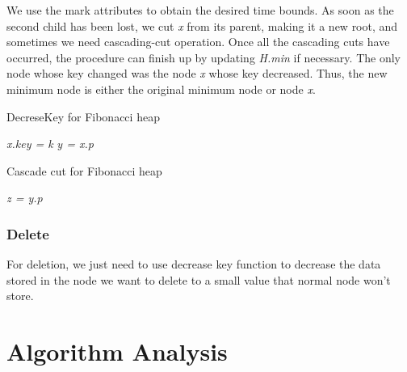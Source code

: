 \documentclass[12pt]{article}
\begin{document}
    We use the mark attributes to obtain the desired time bounds.
    As soon as the second child has been lost, we cut \emph{x} from its parent, making it a new
    root, and sometimes we need cascading-cut operation. Once all the cascading 
    cuts have occurred, the procedure can finish up by updating \emph{H.min} if necessary. The only node whose key changed
    was the node \emph{x} whose key decreased. Thus, the new minimum node is either the
    original minimum node or node \emph{x}.

    \begin{algorithm}
        \caption{DecreseKey for Fibonacci heap}
        \LinesNumbered
        \emph{x.key = k}\;
        \emph{y = x.p}\;
    \end{algorithm}

    \begin{algorithm}
        \caption{Cascade cut for Fibonacci heap}
        \LinesNumbered
        \emph{z = y.p}\;
    \end{algorithm}
    \subsubsection{Delete}
    For deletion, we just need to use decrease key function to decrease
    the data stored in the node we want to delete to a small value that 
    normal node won't store. 

    \section{Algorithm Analysis}
\end{document}
